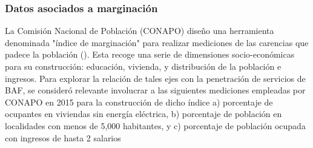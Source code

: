 \documentclass[9pt,twocolumn,twoside]{ilcss}
\begin{document}

\subsubsection{Datos asociados a marginación}

La Comisión Nacional de Población (CONAPO) diseño una herramienta denominada "índice de marginación" para realizar mediciones de las carencias que padece la población (\cite{CONAPO2015}). Esta recoge una serie de dimensiones socio-económicas para su construcción: educación, vivienda, y distribución de la población e ingresos. Para explorar la relación de tales ejes con la penetración de servicios de BAF, se consideró relevante involucrar a las siguientes mediciones empleadas por CONAPO en 2015 para la construcción de dicho índice a) porcentaje de ocupantes en viviendas sin energía eléctrica, b) porcentaje de población en localidades con menos de 5,000 habitantes, y c) porcentaje de población ocupada con ingresos de hasta 2 salarios

\end{document}
